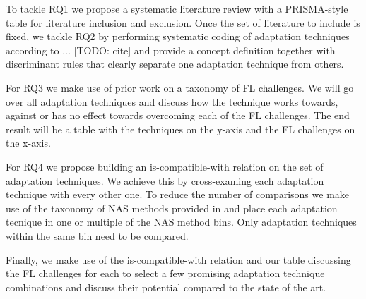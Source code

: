 To tackle RQ1 we propose a systematic literature review with a PRISMA-style table for literature inclusion and exclusion. Once the set of literature to include is fixed, we tackle RQ2 by performing systematic coding of adaptation techniques according to ... [TODO: cite] and provide a concept definition together with discriminant rules that clearly separate one adaptation technique from others. 

For RQ3 we make use of prior work on a taxonomy of FL challenges. We will go over all adaptation techniques and discuss how the technique works towards, against or has no effect towards overcoming each of the FL challenges. The end result will be a table with the techniques on the y-axis and the FL challenges on the x-axis.

For RQ4 we propose building an is-compatible-with relation on the set of adaptation techniques. We achieve this by cross-examing each adaptation technique with every other one. To reduce the number of comparisons we make use of the taxonomy of NAS methods provided in \cite{nas_1000_papers_2023} and place each adaptation tecnique in one or multiple of the NAS method bins. Only adaptation techniques within the same bin need to be compared.

Finally, we make use of the is-compatible-with relation and our table discussing the FL challenges for each to select a few promising adaptation technique combinations and discuss their potential compared to the state of the art.